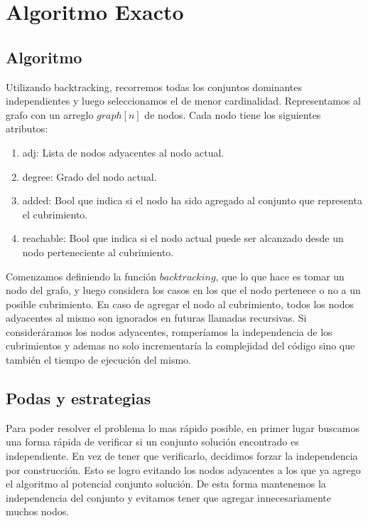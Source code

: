 \section{Algoritmo Exacto}

\subsection{Algoritmo}
Utilizando backtracking, recorremos todas los conjuntos dominantes independientes y luego seleccionamos el de menor cardinalidad.
Representamos al grafo con un arreglo $graph[n]$ de nodos. Cada nodo tiene los siguientes atributos:

\begin{enumerate}
	\item adj: Lista de nodos adyacentes al nodo actual.
	\item degree: Grado del nodo actual.
	\item added: Bool que indica si el nodo ha sido agregado al conjunto que representa el cubrimiento.
	\item reachable: Bool que indica si el nodo actual puede ser alcanzado desde un nodo perteneciente al cubrimiento.
\end{enumerate}

Comenzamos definiendo la función $backtracking$, que lo que hace es tomar un nodo del grafo, y luego considera los casos en los que el nodo pertenece o no a un posible cubrimiento. En caso de agregar el nodo al cubrimiento, todos los nodos adyacentes al mismo son ignorados en futuras llamadas recursivas. Si consideráramos los nodos adyacentes, romperíamos la independencia de los  cubrimientos y ademas no solo incrementaría la complejidad del código sino que también el tiempo de ejecución del mismo.

\subsection{Podas y estrategias}

Para poder resolver el problema lo mas rápido posible, en primer lugar buscamos una forma rápida de verificar si un conjunto solución encontrado es independiente. En vez de tener que verificarlo, decidimos forzar la independencia por construcción. Esto se logro evitando los nodos adyacentes a los que ya agrego el algoritmo al potencial conjunto solución. De esta forma mantenemos la independencia del conjunto y evitamos tener que agregar innecesariamente muchos nodos. 

